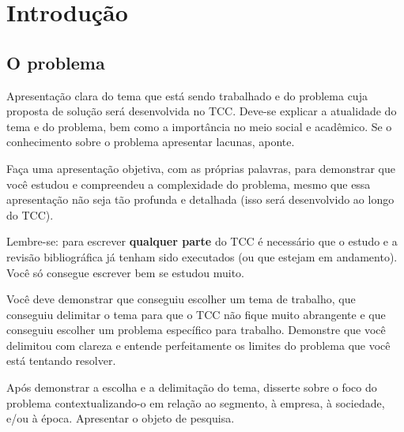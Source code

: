 %
%
%


\chapter{Introdução}
\label{sec:intro}


\section{O problema}
\label{sec:intro:prob}

Apresentação clara do tema que está sendo trabalhado e do problema cuja proposta
de solução será desenvolvida no TCC. Deve-se explicar a atualidade do tema e do
problema, bem como a importância no meio social e acadêmico. Se o conhecimento
sobre o problema apresentar lacunas, aponte.

Faça uma apresentação objetiva, com as próprias palavras, para demonstrar que
você estudou e compreendeu a complexidade do problema, mesmo que essa
apresentação não seja tão profunda e detalhada (isso será desenvolvido ao longo
do TCC).

Lembre-se: para escrever \textbf{qualquer parte} do TCC é necessário que o
estudo e a revisão bibliográfica já tenham sido executados (ou que estejam em
andamento). Você só consegue escrever bem se estudou muito.

Você deve demonstrar que conseguiu escolher um tema de trabalho, que conseguiu
delimitar o tema para que o TCC não fique muito abrangente e que conseguiu
escolher um problema específico para trabalho. Demonstre que você delimitou com
clareza e entende perfeitamente os limites do problema que você está tentando
resolver.

Após demonstrar a escolha e a delimitação do tema, disserte sobre o foco do
problema contextualizando-o em relação ao segmento, à empresa, à sociedade, e/ou
à época. Apresentar o objeto de pesquisa.


